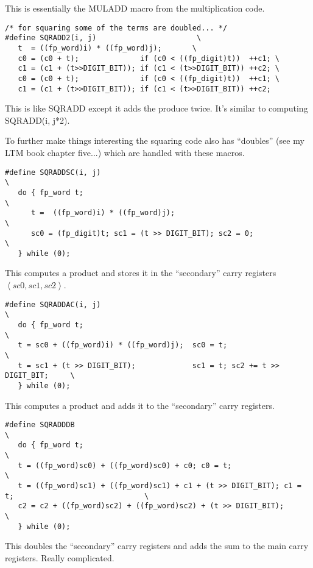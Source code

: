 \documentclass[b5paper]{book}
\begin{document}
This is essentially the MULADD macro from the multiplication code.

\begin{verbatim}
/* for squaring some of the terms are doubled... */
#define SQRADD2(i, j)                       \
   t  = ((fp_word)i) * ((fp_word)j);       \
   c0 = (c0 + t);              if (c0 < ((fp_digit)t))  ++c1; \
   c1 = (c1 + (t>>DIGIT_BIT)); if (c1 < (t>>DIGIT_BIT)) ++c2; \
   c0 = (c0 + t);              if (c0 < ((fp_digit)t))  ++c1; \
   c1 = (c1 + (t>>DIGIT_BIT)); if (c1 < (t>>DIGIT_BIT)) ++c2; 
\end{verbatim}

This is like SQRADD except it adds the produce twice.  It's similar to 
computing SQRADD(i, j*2).

To further make things interesting the squaring code also has ``doubles'' (see my LTM book chapter five...) which are
handled with these macros.

\begin{verbatim}
#define SQRADDSC(i, j)                                                         \
   do { fp_word t;                                                             \
      t =  ((fp_word)i) * ((fp_word)j);                                        \
      sc0 = (fp_digit)t; sc1 = (t >> DIGIT_BIT); sc2 = 0;                      \
   } while (0);
\end{verbatim}
This computes a product and stores it in the ``secondary'' carry registers $\left < sc0, sc1, sc2 \right >$.

\begin{verbatim}
#define SQRADDAC(i, j)                                                         \
   do { fp_word t;                                                             \
   t = sc0 + ((fp_word)i) * ((fp_word)j);  sc0 = t;                            \
   t = sc1 + (t >> DIGIT_BIT);             sc1 = t; sc2 += t >> DIGIT_BIT;     \
   } while (0);
\end{verbatim}
This computes a product and adds it to the ``secondary'' carry registers.

\begin{verbatim}
#define SQRADDDB                                                               \
   do { fp_word t;                                                             \
   t = ((fp_word)sc0) + ((fp_word)sc0) + c0; c0 = t;                                                 \
   t = ((fp_word)sc1) + ((fp_word)sc1) + c1 + (t >> DIGIT_BIT); c1 = t;                              \
   c2 = c2 + ((fp_word)sc2) + ((fp_word)sc2) + (t >> DIGIT_BIT);                                     \
   } while (0);
\end{verbatim}
This doubles the ``secondary'' carry registers and adds the sum to the main carry registers.  Really complicated.
\end{document}
